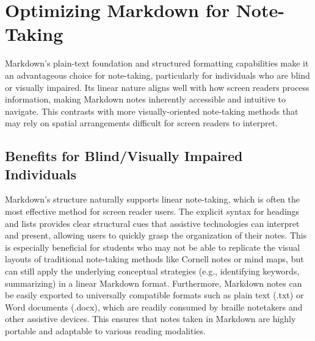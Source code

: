 \section{Optimizing Markdown for Note-Taking}
\label{sec:markdown-note-taking}

Markdown's plain-text foundation and structured formatting capabilities make it an advantageous choice for note-taking, particularly for individuals who are blind or visually impaired. Its linear nature aligns well with how screen readers process information, making Markdown notes inherently accessible and intuitive to navigate.\cite{PerkinsNoteTaking}\cite{TeachingVI} This contrasts with more visually-oriented note-taking methods that may rely on spatial arrangements difficult for screen readers to interpret.

\subsection{Benefits for Blind/Visually Impaired Individuals}
Markdown's structure naturally supports linear note-taking, which is often the most effective method for screen reader users.\cite{PerkinsNoteTaking} The explicit syntax for headings and lists provides clear structural cues that assistive technologies can interpret and present, allowing users to quickly grasp the organization of their notes.\cite{TeachingVI}\cite{MarkdownToolbox} This is especially beneficial for students who may not be able to replicate the visual layouts of traditional note-taking methods like Cornell notes or mind maps, but can still apply the underlying conceptual strategies (e.g., identifying keywords, summarizing) in a linear Markdown format.\cite{PerkinsNoteTaking} Furthermore, Markdown notes can be easily exported to universally compatible formats such as plain text (.txt) or Word documents (.docx), which are readily consumed by braille notetakers and other assistive devices.\cite{TeachingVI} This ensures that notes taken in Markdown are highly portable and adaptable to various reading modalities.

